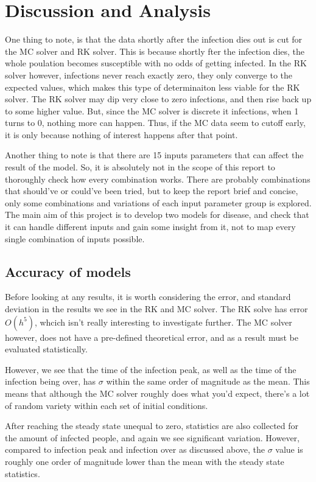 \section{Discussion and Analysis}
One thing to note, is that the data shortly after the infection dies out is cut for the MC solver and RK solver. 
This is because shortly fter the infection dies, the whole poulation becomes susceptible with no odds of getting infected.
In the RK solver however, infections never reach exactly zero, they only converge to the expected values, which makes this type of determinaiton less viable for the RK solver.
The RK solver may dip very close to zero infections, and then rise back up to some higher value. 
But, since the MC solver is discrete it infections, when 1 turns to 0, nothing more can happen.
Thus, if the MC data seem to cutoff early, it is only because nothing of interest happens after that point.

Another thing to note is that there are 15 inputs parameters that can affect the result of the model. 
So, it is absolutely not in the scope of this report to thoroughly check how every combination works.
There are probably combinations that should've or could've been tried, but to keep the report brief and concise, only some combinations and variations of each input parameter group is explored.
The main aim of this project is to develop two models for disease, and check that it can handle different inputs and gain some insight from it, not to map every single combination of inputs possible.

\subsection{Accuracy of models}
Before looking at any results, it is worth considering the error, and standard deviation in the results we see in the RK and MC solver.
The RK solve has error $O(h^5)$, whcich isn't really interesting to investigate further.
The MC solver however, does not have a pre-defined theoretical error, and as a result must be evaluated statistically.

However, we see that the time of the infection peak, as well as the time of the infection being over, has $\sigma$ within the same order of magnitude as the mean.
This means that although the MC solver roughly does what you'd expect, there's a lot of random variety within each set of initial conditions.

After reaching the steady state unequal to zero, statistics are also collected for the amount of infected people, and again we see significant variation. 
However, compared to infection peak and infection over as discussed above, the $\sigma$ value is roughly one order of magnitude lower than the mean with the steady state statistics. 


